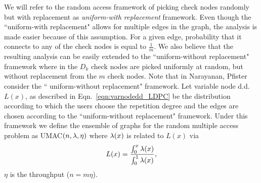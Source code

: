 We will refer to the random access framework of picking check nodes randomly but with replacement as \textit{uniform-with replacement} framework. Even though the ``uniform-with replacement" allows for multiple edges in the graph, the analysis is made easier because of this assumption. For a given edge, probability that it connects to any of the check nodes is equal to $\frac{1}{m}$. We also believe that the resulting analysis can be easily extended to the ``uniform-without replacement" framework where in the $D_{k}$ check nodes are picked uniformly at random, but without replacement from the $m$ check nodes. Note that in Narayanan, Pfister \cite{narayanan2012iterative} consider the `` uniform-without replacement" framework. Let  variable node d.d. $L(x)$, as described in Eqn.~\eqref{eqn:varnodedd_LDPC} be the distribution according to which the users choose the repetition degree and the edges are chosen according to the ``uniform-without replacement" framework. Under this framework we define the ensemble of graphs for the random multiple access problem as UMAC$(n,\lambda,\eta)$ where $\lambda(x)$ is related to $L(x)$ via
\begin{align*}
L(x)=\frac{\int_{0}^{x}\lambda(x)}{\int_{0}^{1}\lambda(x)},
\end{align*}
 $\eta$ is the throughput ($n=m\eta$).


